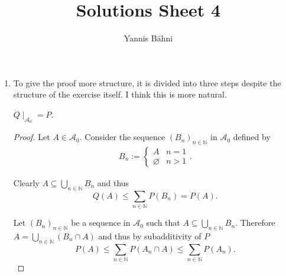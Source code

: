 
\DeclareMathOperator{\Poi}{Poi}
\DeclareMathOperator{\Bin}{Bin}

\title{Solutions Sheet 4}
\author{Yannis B\"{a}hni}
\address[Yannis B\"{a}hni]{University of Zurich, R\"{a}mistrasse 71, 8006 Zurich}


\maketitle
\thispagestyle{fancy}
\begin{enumerate}[label = \textbf{Exercise \arabic*.},wide = 0pt, itemsep=1.5ex]
	\item To give the proof more structure, it is divided into three steps despite the structure of the exercise itself. I think this is more natural.
		\begin{lemma}
			$Q\mid_{\mathcal{A}_0} = P$.
		\end{lemma}

		\begin{proof}
			Let $A \in \mathcal{A}_0$. Consider the sequence $(B_n)_{n \in \mathbb{N}}$ in $\mathcal{A}_0$ defined by 
			\begin{align*}
				B_n := \begin{cases}
					A & n = 1\\
					\varnothing & n > 1
				\end{cases}.
			\end{align*}

			Clearly $A \subseteq \bigcup_{n \in \mathbb{N}}B_n$ and thus
			\begin{equation}
				Q(A) \leq \sum_{n \in \mathbb{N}} P(B_n) = P(A).
			\end{equation}

			Let $(B_n)_{n \in \mathbb{N}}$ be a sequence in $\mathcal{A}_0$ such that $A \subseteq \bigcup_{n \in \mathbb{N}} B_n$. Therefore $A = \bigcup_{n \in \mathbb{N}} (B_n \cap A)$ and thus by subadditivity of $P$
			\begin{equation}
				P(A) \leq \sum_{n \in \mathbb{N}} P(A_n \cap A) \leq \sum_{n \in \mathbb{N}} P(A_n).
			\end{equation}


\end{proof}
\end{enumerate}
